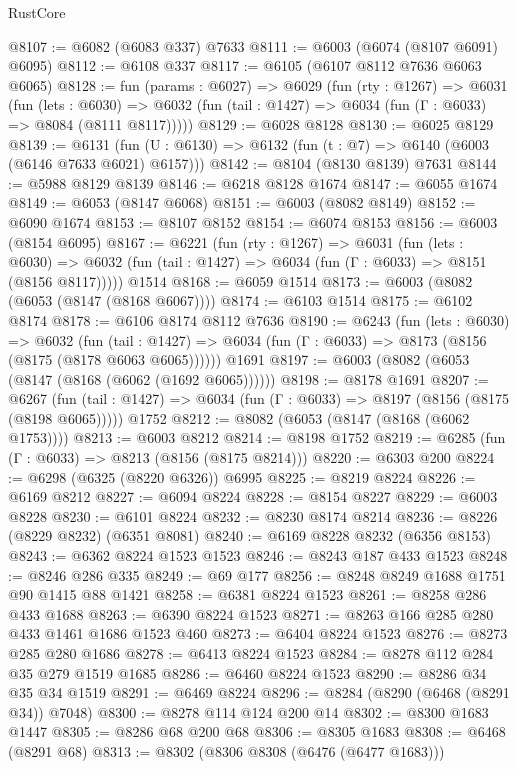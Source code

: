 \begin{lexlean}{RustCore}
\begin{coremodule}
{\begin{coremodule}
{{{{{{{{{{{{{{{{{{{{{{{{{{{{{{{{{{{{{{{{{{{{{{{@8107 := @6082 (@6083 @337) @7633
@8111 := @6003 (@6074 (@8107 @6091) @6095)
@8112 := @6108 @337
@8117 := @6105 (@6107 @8112 @7636 @6063 @6065)
@8128 := fun (params : @6027) =>
  @6029
    (fun (rty : @1267) =>
    @6031
      (fun (lets : @6030) =>
      @6032 (fun (tail : @1427) => @6034 (fun (Γ : @6033) => @8084 (@8111 @8117)))))
@8129 := @6028 @8128
@8130 := @6025 @8129
@8139 := @6131 (fun (U : @6130) => @6132 (fun (t : @7) => @6140 (@6003 (@6146 @7633 @6021) @6157)))
@8142 := @8104 (@8130 @8139) @7631
@8144 := @5988 @8129 @8139
@8146 := @6218 @8128 @1674
@8147 := @6055 @1674
@8149 := @6053 (@8147 @6068)
@8151 := @6003 (@8082 @8149)
@8152 := @6090 @1674
@8153 := @8107 @8152
@8154 := @6074 @8153
@8156 := @6003 (@8154 @6095)
@8167 := @6221
    (fun (rty : @1267) =>
    @6031
      (fun (lets : @6030) =>
      @6032 (fun (tail : @1427) => @6034 (fun (Γ : @6033) => @8151 (@8156 @8117)))))
    @1514
@8168 := @6059 @1514
@8173 := @6003 (@8082 (@6053 (@8147 (@8168 @6067))))
@8174 := @6103 @1514
@8175 := @6102 @8174
@8178 := @6106 @8174 @8112 @7636
@8190 := @6243
    (fun (lets : @6030) =>
    @6032
      (fun (tail : @1427) => @6034 (fun (Γ : @6033) => @8173 (@8156 (@8175 (@8178 @6063 @6065))))))
    @1691
@8197 := @6003 (@8082 (@6053 (@8147 (@8168 (@6062 (@1692 @6065))))))
@8198 := @8178 @1691
@8207 := @6267
    (fun (tail : @1427) => @6034 (fun (Γ : @6033) => @8197 (@8156 (@8175 (@8198 @6065)))))
    @1752
@8212 := @8082 (@6053 (@8147 (@8168 (@6062 @1753))))
@8213 := @6003 @8212
@8214 := @8198 @1752
@8219 := @6285 (fun (Γ : @6033) => @8213 (@8156 (@8175 @8214)))
@8220 := @6303 @200
@8224 := @6298 (@6325 (@8220 @6326)) @6995
@8225 := @8219 @8224
@8226 := @6169 @8212
@8227 := @6094 @8224
@8228 := @8154 @8227
@8229 := @6003 @8228
@8230 := @6101 @8224
@8232 := @8230 @8174 @8214
@8236 := @8226 (@8229 @8232) (@6351 @8081)
@8240 := @6169 @8228 @8232 (@6356 @8153)
@8243 := @6362 @8224 @1523 @1523
@8246 := @8243 @187 @433 @1523
@8248 := @8246 @286 @335
@8249 := @69 @177
@8256 := @8248 @8249 @1688 @1751 @90 @1415 @88 @1421
@8258 := @6381 @8224 @1523
@8261 := @8258 @286 @433 @1688
@8263 := @6390 @8224 @1523
@8271 := @8263 @166 @285 @280 @433 @1461 @1686 @1523 @460
@8273 := @6404 @8224 @1523
@8276 := @8273 @285 @280 @1686
@8278 := @6413 @8224 @1523
@8284 := @8278 @112 @284 @35 @279 @1519 @1685
@8286 := @6460 @8224 @1523
@8290 := @8286 @34 @35 @34 @1519
@8291 := @6469 @8224
@8296 := @8284 (@8290 (@6468 (@8291 @34)) @7048)
@8300 := @8278 @114 @124 @200 @14
@8302 := @8300 @1683 @1447
@8305 := @8286 @68 @200 @68
@8306 := @8305 @1683
@8308 := @6468 (@8291 @68)
@8313 := @8302 (@8306 @8308 (@6476 (@6477 @1683)))
}}}}}}}}}}}}}}}}}}}}}}}}}}}}}}}}}}}}}}}}}}}}}}}
\end{coremodule}}
\end{coremodule}
\end{lexlean}
